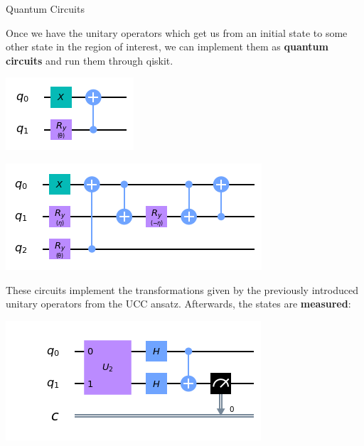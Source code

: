 \documentclass[9pt, handout, aspectratio=169]{beamer}		%
\begin{document}
	\begin{frame}{Quantum Circuits}

		\medskip

		Once we have the unitary operators which get us from an initial state to some other state in the region of interest, we can implement them as \textbf{quantum circuits} and run them through qiskit.

		\begin{multicols}{2}

			\begin{center}
				\includegraphics[height=.24\paperheight]{Figures/u2_circuit}
			\end{center}

			\columnbreak

			\begin{center}
				\includegraphics[height=.24\paperheight]{Figures/u3_circuit}
			\end{center}

		\end{multicols}

		These circuits implement the transformations given by the previously introduced unitary operators from the UCC ansatz. Afterwards, the states are \textbf{measured}:

		\begin{multicols}{2}

			\begin{center}
				\includegraphics[height=.24\paperheight]{Figures/u2_measure}
			\end{center}


\end{multicols}
\end{frame}
\end{document}
